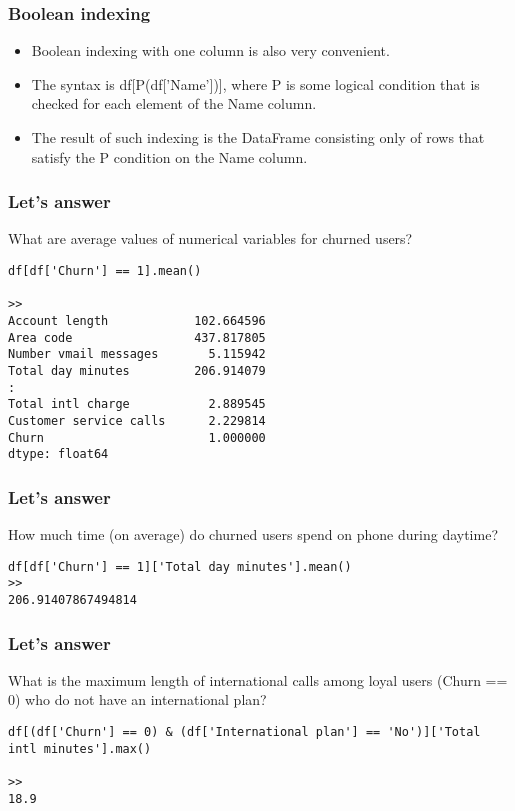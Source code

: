 \begin{frame}[fragile]\frametitle{Boolean indexing}	
\begin{itemize}
\item Boolean indexing with one column is also very convenient. 
\item The syntax is df[P(df['Name'])], where P is some logical condition that is checked for each element of the Name column. 
\item The result of such indexing is the DataFrame consisting only of rows that satisfy the P condition on the Name column.
\end{itemize}

\end{frame}


\begin{frame}[fragile]\frametitle{Let's answer}	
What are average values of numerical variables for churned users?

\begin{lstlisting}
df[df['Churn'] == 1].mean()

>> 
Account length            102.664596
Area code                 437.817805
Number vmail messages       5.115942
Total day minutes         206.914079
:
Total intl charge           2.889545
Customer service calls      2.229814
Churn                       1.000000
dtype: float64

\end{lstlisting}
\end{frame}

\begin{frame}[fragile]\frametitle{Let's answer}	
How much time (on average) do churned users spend on phone during daytime?

\begin{lstlisting}
df[df['Churn'] == 1]['Total day minutes'].mean()
>> 
206.91407867494814
\end{lstlisting}
\end{frame}

\begin{frame}[fragile]\frametitle{Let's answer}	
What is the maximum length of international calls among loyal users (Churn == 0) who do not have an international plan?
\begin{lstlisting}
df[(df['Churn'] == 0) & (df['International plan'] == 'No')]['Total intl minutes'].max()

>> 
18.9
\end{lstlisting}
\end{frame}


